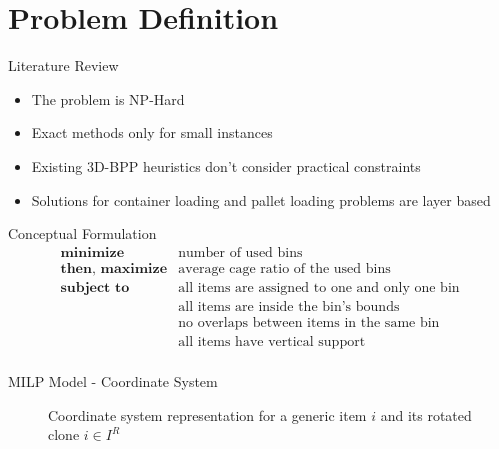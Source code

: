 \documentclass{beamer}
\begin{document}
    \section{Problem Definition}
    \begin{frame}{Literature Review}
        \begin{itemize}
            \item The problem is NP-Hard
            \item Exact methods only for small instances %
            \item Existing 3D-BPP heuristics don't consider practical constraints
            \item Solutions for container loading and pallet loading problems are layer based
        \end{itemize}
    \end{frame}

    \begin{frame}{Conceptual Formulation}
        \begin{eqnarray*}
            \textbf{minimize} & \text{number of used bins} \\
            \textbf{then, maximize} & \text{average cage ratio of the used bins} \\
            \textbf{subject to} & \text{all items are assigned to one and only one bin} \\
                                              & \text{all items are inside the bin's bounds} \\
                                              & \text{no overlaps between items in the same bin} \\
                                              & \text{all items have vertical support} \\
        \end{eqnarray*}
    \end{frame}

    \begin{frame}{MILP Model - Coordinate System}
        \begin{figure}
            \scalebox{0.45}{%
            
            }
            \caption{Coordinate system representation for a generic item $i$ and its rotated clone $i \in I^R$}
            \label{fig:coordinate_system}
        \end{figure}
    \end{frame}
\end{document}
